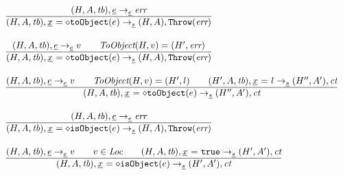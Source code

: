 \documentclass[a4paper, leqno]{amsart}
\newcommand{\rulesep}{\quad\quad}
\newcommand{\stmt}{s}
\newcommand{\expr}{e}
\newcommand{\ir}[1]{\ensuremath{\underline{#1}}}
\newcommand{\irid}{\ir{x}}
\newcommand{\true}{{\tt true}}
\newcommand{\tb}{\emph{tb}}
\newcommand{\err}{\emph{err}}
\newcommand{\Loc}{\emph{Loc}}
\newcommand{\ct}{\emph{ct}}
\newcommand{\hf}[1]{\emph{#1}}
\newcommand{\error}{\ensuremath{{\tt Throw}(\err)}}
\newcommand{\state}{\ensuremath{(H,A,\tb)}}
\newcommand{\res}{\ensuremath{(H,A)}}
\newcommand{\resp}{\ensuremath{(H',A')}}
\newcommand{\evale}{\ensuremath{(H,A,\tb)}}
\begin{document}
\[
\begin{array}{l@{~~}l@{~~}ll}

\frac{\begin{matrix}
\evale, \ir{\expr} \rightarrow_{\ir\expr} \err
\end{matrix}}{\begin{matrix}
\state, \irid \ {\tt = {\diamond}toObject}(e)  \rightarrow_{\ir\stmt} \res, \error
\end{matrix}}
\\[2em]

\frac{\begin{matrix}
\evale, \ir{\expr} \rightarrow_{\ir\expr} v
\rulesep
\hf{ToObject}(H,v) = (H',\err)
\end{matrix}}{\begin{matrix}
\state, \irid \ {\tt = {\diamond}toObject}(e)  \rightarrow_{\ir\stmt} \res, \error
\end{matrix}}
\\[2em]

\frac{\begin{matrix}
\evale, \ir{\expr} \rightarrow_{\ir\expr} v
\rulesep
\hf{ToObject}(H,v) = (H',l)
\rulesep
(H',A,\tb), \irid \ {\tt =} \ l \rightarrow_{\ir\stmt} (H'',A'), \ct
\end{matrix}}{\begin{matrix}
\state, \irid \ {\tt = {\diamond}toObject}(e)  \rightarrow_{\ir\stmt} (H'',A'), \ct
\end{matrix}}
\\[2em]

\frac{\begin{matrix}
\evale, \ir{\expr} \rightarrow_{\ir\expr} \err
\end{matrix}}{\begin{matrix}
\state, \irid \ {\tt = {\diamond}isObject}(e)  \rightarrow_{\ir\stmt} \res, \error
\end{matrix}}
\\[2em]

\frac{\begin{matrix}
\evale, \ir{\expr} \rightarrow_{\ir\expr} v
\rulesep
v\in\Loc
\rulesep
\state, \irid \ {\tt =} \ \true \rightarrow_{\ir\stmt} \resp, \ct
\end{matrix}}{\begin{matrix}
\state, \irid \ {\tt = {\diamond}isObject}(e)  \rightarrow_{\ir\stmt} \resp, \ct
\end{matrix}}
\\[2em]


\end{array}\]
\end{document}
